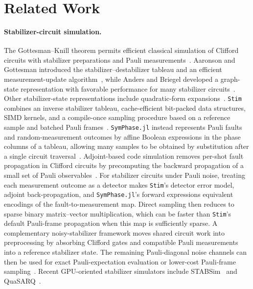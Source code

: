 \documentclass[a4paper,onecolumn,unpublished]{quantumarticle}
\newcommand{\tFont}[1]{\texttt{#1}}
\newcommand{\stim}{\tFont{Stim}}
\newcommand{\symphase}{\tFont{SymPhase.jl}}
\begin{document}
\section{Related Work}
\label{sec:related-work}

\paragraph{Stabilizer-circuit simulation.}
The Gottesman--Knill theorem permits efficient classical simulation of Clifford circuits with stabilizer preparations and Pauli measurements~\cite{Gottesman98}.
Aaronson and Gottesman introduced the stabilizer--destabilizer tableau and an efficient measurement-update algorithm~\cite{AG04},
while Anders and Briegel developed a graph-state representation with favorable performance for many stabilizer circuits~\cite{AB06}.
Other stabilizer-state representations include quadratic-form expansions~\cite{BH22}.
\stim{} combines an inverse stabilizer tableau, cache-efficient bit-packed data structures, SIMD kernels, and a compile-once sampling procedure based on a reference sample and batched Pauli frames~\cite{Gidney21}.
\symphase{} instead represents Pauli faults and random-measurement outcomes by affine Boolean expressions in the phase columns of a tableau, allowing many samples to be obtained by substitution after a single circuit traversal~\cite{FY24b}.
Adjoint-based code simulation removes per-shot fault propagation in Clifford circuits by precomputing the backward propagation of a small set of Pauli observables~\cite{DP23}.
For stabilizer circuits under Pauli noise, treating each measurement outcome as a detector makes \stim{}'s detector error model, adjoint back-propagation, and \symphase{}'s forward expressions equivalent encodings of the fault-to-measurement map.
Direct sampling then reduces to sparse binary matrix--vector multiplication, which can be faster than \stim{}'s default Pauli-frame propagation when this map is sufficiently sparse.
A complementary noisy-stabilizer framework moves shared circuit work into preprocessing by absorbing Clifford gates and compatible Pauli measurements into a reference stabilizer state. The remaining Pauli-diagonal noise channels can then be used for exact Pauli-expectation evaluation or lower-cost Pauli-frame sampling~\cite{AMM26}.
Recent GPU-oriented stabilizer simulators include STABSim~\cite{GLW+25} and QuaSARQ~\cite{OTL26}.
\end{document}
